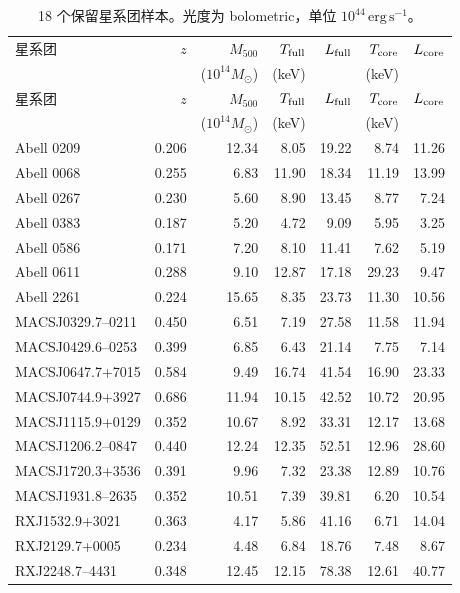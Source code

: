 \documentclass[UTF8,11pt,fontset=none]{ctexart}
\begin{document}
\begin{longtable}{lrrrrrr}
\caption{18 个保留星系团样本。光度为 bolometric，单位 $10^{44}\,\mathrm{erg\,s^{-1}}$。}\\
\toprule
星系团 & $z$ & $M_{500}$ & $T_{\rm full}$ & $L_{\rm full}$ & $T_{\rm core}$ & $L_{\rm core}$ \\
 & & ($10^{14}M_\odot$) & (keV) & & (keV) & \\
\midrule
\endfirsthead
\toprule
星系团 & $z$ & $M_{500}$ & $T_{\rm full}$ & $L_{\rm full}$ & $T_{\rm core}$ & $L_{\rm core}$ \\
 & & ($10^{14}M_\odot$) & (keV) & & (keV) & \\
\midrule
\endhead
Abell 0209 & 0.206 & 12.34 & 8.05 & 19.22 & 8.74 & 11.26 \\
Abell 0068 & 0.255 & 6.83 & 11.90 & 18.34 & 11.19 & 13.99 \\
Abell 0267 & 0.230 & 5.60 & 8.90 & 13.45 & 8.77 & 7.24 \\
Abell 0383 & 0.187 & 5.20 & 4.72 & 9.09 & 5.95 & 3.25 \\
Abell 0586 & 0.171 & 7.20 & 8.10 & 11.41 & 7.62 & 5.19 \\
Abell 0611 & 0.288 & 9.10 & 12.87 & 17.18 & 29.23 & 9.47 \\
Abell 2261 & 0.224 & 15.65 & 8.35 & 23.73 & 11.30 & 10.56 \\
MACSJ0329.7--0211 & 0.450 & 6.51 & 7.19 & 27.58 & 11.58 & 11.94 \\
MACSJ0429.6--0253 & 0.399 & 6.85 & 6.43 & 21.14 & 7.75 & 7.14 \\
MACSJ0647.7+7015 & 0.584 & 9.49 & 16.74 & 41.54 & 16.90 & 23.33 \\
MACSJ0744.9+3927 & 0.686 & 11.94 & 10.15 & 42.52 & 10.72 & 20.95 \\
MACSJ1115.9+0129 & 0.352 & 10.67 & 8.92 & 33.31 & 12.17 & 13.68 \\
MACSJ1206.2--0847 & 0.440 & 12.24 & 12.35 & 52.51 & 12.96 & 28.60 \\
MACSJ1720.3+3536 & 0.391 & 9.96 & 7.32 & 23.38 & 12.89 & 10.76 \\
MACSJ1931.8--2635 & 0.352 & 10.51 & 7.39 & 39.81 & 6.20 & 10.54 \\
RXJ1532.9+3021 & 0.363 & 4.17 & 5.86 & 41.16 & 6.71 & 14.04 \\
RXJ2129.7+0005 & 0.234 & 4.48 & 6.84 & 18.76 & 7.48 & 8.67 \\
RXJ2248.7--4431 & 0.348 & 12.45 & 12.15 & 78.38 & 12.61 & 40.77 \\
\bottomrule
\end{longtable}



\end{document}
